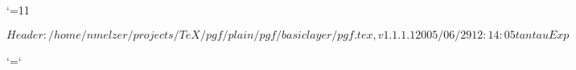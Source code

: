 %

\edef\pgfatcode{\the\catcode`\@}
\catcode`\@=11



\ProvidesPackageRCS $Header: /home/nmelzer/projects/TeX/pgf/plain/pgf/basiclayer/pgf.tex,v 1.1.1.1 2005/06/29 12:14:05 tantau Exp $






\catcode`\@=\pgfatcode

\endinput
